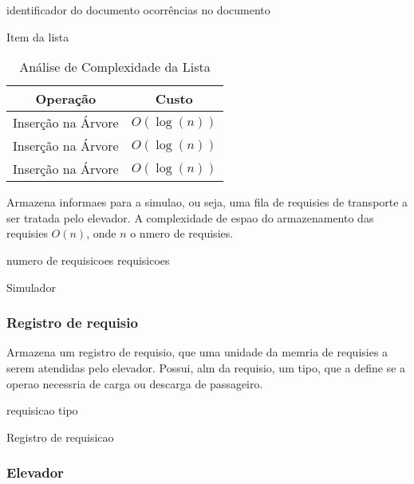\documentclass[12pt]{article}
\begin{document}
\begin{algorithm}[h!]
\begin{footnotesize}
	identificador do documento\;
	ocorrências no documento\;
\caption{Item da lista}
\end{footnotesize}
\end{algorithm}

\begin{table}[ht]
  \caption{Análise de Complexidade da Lista}
  \centering
  \begin{tabular}{c c}
  \hline\hline
  Operação & Custo \\ [0.5ex]
  \hline
  Inserção na Árvore & $O(\log(n))$ \\
  Inserção na Árvore & $O(\log(n))$ \\
  Inserção na Árvore & $O(\log(n))$ \\
  \hline
  \end{tabular}
  \label{table:nonlin}
\end{table}

Armazena informaes para a simulao, ou seja, uma fila de requisies de transporte a ser tratada pelo elevador. A complexidade de espao do armazenamento das requisies  $O(n)$, onde $n$  o nmero de requisies.
\begin{algorithm}[h!]
\begin{footnotesize}
	numero de requisicoes\;
	requisicoes\;

\caption{Simulador}%
\end{footnotesize}
\end{algorithm}

\subsubsection{Registro de requisio}

Armazena um registro de requisio, que  uma unidade da memria de requisies a serem atendidas pelo elevador. Possui, alm da requisio, um tipo, que a define se a operao necessria  de carga ou descarga de passageiro.
\begin{algorithm}[h!]
\begin{footnotesize}

	requisicao\;
	tipo\;

\caption{Registro de requisicao}%
\end{footnotesize}
\end{algorithm}


\subsubsection{Elevador}
\end{document}

